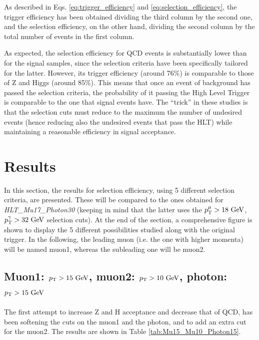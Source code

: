 \documentclass[11pt, a4paper]{article}
\newcommand{\GeV}{\textrm{ }\mathrm{GeV}}
\newcommand{\pt}{p_{\rm T}}
\begin{document}
As described in Eqs. \ref{eq:trigger_efficiency} and \ref{eq:selection_efficiency}, the trigger efficiency has been obtained dividing the third column by the second one, and the selection efficiency, on the other hand, dividing the second column by the total number of events in the first column.

As expected, the selection efficiency for QCD events is substantially lower than for the signal samples, since the selection criteria have been specifically tailored for the latter. However, its trigger efficiency (around 76\%) is comparable to those of Z and Higgs (around 85\%). This means that once an event of background has passed the selection criteria, the probability of it passing the High Level Trigger is comparable to the one that signal events have. The ``trick'' in these studies is that the selection cuts must reduce to the maximum the number of undesired events (hence reducing also the undesired events that pass the HLT) while maintaining a reasonable efficiency in signal acceptance.

\section{Results}
In this section, the results for selection efficiency, using 5 different selection criteria, are presented. These will be compared to the ones obtained for {\it HLT\_Mu17\_Photon30} (keeping in mind that the latter uses the $\pt^{\mu}>18\GeV$, $\pt^{\gamma}>32\GeV$ selection cuts). At the end of the section, a comprehensive figure is shown to display the 5 different possibilities studied along with the original trigger. In the following, the leading muon (i.e. the one with higher momenta) will be named muon1, whereas the subleading one will be muon2.

\subsection{Muon1: $\pt > 15\GeV$, muon2: $\pt > 10\GeV$, photon: $\pt>15\GeV$\label{sec:Mu15_Mu10_Photon15}}
The first attempt to increase Z and H acceptance and decrease that of QCD, has been softening the cuts on the muon1 and the photon, and to add an extra cut for the muon2. The results are shown in Table \ref{tab:Mu15_Mu10_Photon15}.
\end{document}
